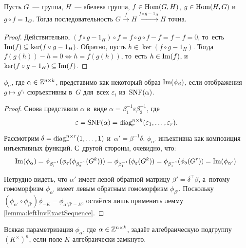 \documentclass[a4paper,oneside]{article}
\begin{document}
\begin{lemma}
\label{lemma:leftInvExactSequence}
    Пусть $G$~— группа, $H$~— абелева группа, $f \in \mathrm{Hom}(G, H)$, $g \in \mathrm{Hom}(H, G)$ и~$g \circ f = 1_G$.
    Тогда последовательность $G \xrightarrow[]{f} H \xrightarrow[]{f \circ g - 1_H} H$ точна.
\end{lemma}

\begin{proof}
    Действительно, $(f \circ g - 1_H) \circ f = f \circ g \circ f - f = f - f = 0$, то~есть $\mathrm{Im}(f) \subseteq \ker(f \circ g - 1_H)$. 
    Обратно, пусть $h \in \ker(f \circ g - 1_H)$. Тогда $f(g(h)) - h = 0 \Leftrightarrow h = f(g(h))$, то~есть $h \in \mathrm{Im}(f)$,
    и~$\ker(f \circ g - 1_H) \subseteq \mathrm{Im}(f)$.
\end{proof}

\begin{lemma}
    $\phi_\alpha$, где $\alpha \in \mathbb{Z}^{n \times k}$, представимо как некоторый образ $\mathrm{Im}(\phi_\beta)$,
    если отображения $g \mapsto g^{\varepsilon_i}$ сюръективны в~$G$ для~всех $\varepsilon_i$ из~$\mathrm{SNF}(\alpha)$.
\end{lemma}

\begin{proof}
    Снова представим $\alpha$ в~виде $\alpha = \beta_1^{-1} \varepsilon \beta_2^{-1}$, где
    $$
        \varepsilon = \mathrm{SNF}(\alpha) = \mathrm{diag}^{n \times k}_r(\varepsilon_1, \ldots, \varepsilon_r).
    $$

    Рассмотрим $\delta = \mathrm{diag}^{n \times r}_r(1, \ldots, 1)$ и~$\alpha' = \beta^{-1} \delta$.
    $\phi_{\alpha'}$ инъективна как композиция инъективных функций. С~другой стороны, очевидно, что:
    $$
        \mathrm{Im}(\phi_\alpha) = \phi_{\beta_1^{-1}} (\phi_\varepsilon (\phi_{\beta_2^{-1}} (G^k)))
                            = \phi_{\beta_1^{-1}} (\phi_\varepsilon (G^k))
                            = \phi_{\beta_1^{-1}} (\phi_{\delta} (G^r))
                            = \mathrm{Im}(\phi_{\alpha'}).
    $$

    Нетрудно видеть, что $\alpha'$ имеет левой обратной матрицу $\beta' = \delta^{\top} \beta$,
    а~потому гомоморфизм $\phi_{\alpha'}$ имеет левым обратным гомоморфизм $\phi_{\beta'}$.
    Поскольку $(\phi_{\alpha'} \circ \phi_{\beta'}) \phi_{-E} = \phi_{\alpha' \beta' - E}$, остаётся лишь применить лемму \ref{lemma:leftInvExactSequence}.
\end{proof}

\begin{theorem}
    Всякая параметризация $\phi_\alpha$, где $\alpha \in \mathbb{Z}^{n \times k}$, задаёт алгебраическую подгруппу $(K^\times)^n$,
    если поле $K$ алгебраически замкнуто.
\end{theorem}
\end{document}
